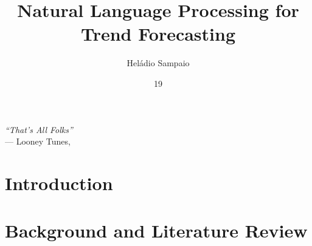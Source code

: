 \documentclass[tg, eng, dv]{ita}    %
\author{Heládio Sampaio}{Lopes}
\title{Natural Language Processing for Trend Forecasting}
\date{19}{JUNE}{2020}
\begin{document}
	
\maketitle

\begin{itadedication}

\end{itadedication}

\begin{itathanks}

\end{itathanks}

\thispagestyle{empty}
\ifhyperref{}\fi
\begin{flushright}
\begin{spacing}{1}
\mbox{}\vfill
{\sffamily\itshape
``That's All Folks''\\}
--- Looney Tunes, \textsc{}
\end{spacing}
\end{flushright}

\begin{abstract}
\noindent

\end{abstract}

\begin{englishabstract}
\noindent

\end{englishabstract}

\listoffigures %

\listoftables %

\listofabbreviations

\listofsymbols

\tableofcontents

\mainmatter

\chapter{Introduction}\label{chap:intro}


\chapter{Background and Literature Review}\label{chap:background}

\end{document}
